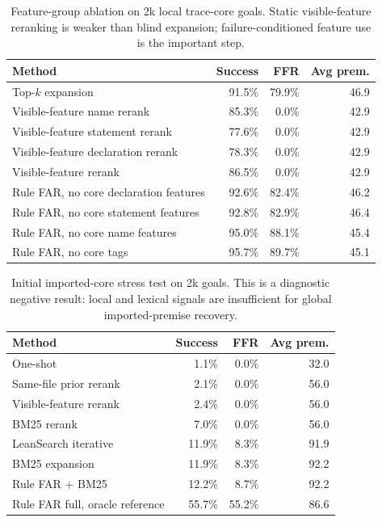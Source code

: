 \documentclass{article}
\begin{document}
\begin{table}[H]
\caption{Feature-group ablation on 2k local trace-core goals. Static visible-feature reranking is weaker than blind expansion; failure-conditioned feature use is the important step.}
\label{tab:appendix-feature}
\centering
\small
\begin{tabular}{lrrr}
\toprule
Method & Success & FFR & Avg prem. \\
\midrule
Top-$k$ expansion & 91.5\% & 79.9\% & 46.9 \\
Visible-feature name rerank & 85.3\% & 0.0\% & 42.9 \\
Visible-feature statement rerank & 77.6\% & 0.0\% & 42.9 \\
Visible-feature declaration rerank & 78.3\% & 0.0\% & 42.9 \\
Visible-feature rerank & 86.5\% & 0.0\% & 42.9 \\
Rule FAR, no core declaration features & 92.6\% & 82.4\% & 46.2 \\
Rule FAR, no core statement features & 92.8\% & 82.9\% & 46.4 \\
Rule FAR, no core name features & 95.0\% & 88.1\% & 45.4 \\
Rule FAR, no core tags & 95.7\% & 89.7\% & 45.1 \\
\bottomrule
\end{tabular}
\end{table}

\begin{table}[H]
\caption{Initial imported-core stress test on 2k goals. This is a diagnostic negative result: local and lexical signals are insufficient for global imported-premise recovery.}
\label{tab:appendix-global-stress}
\centering
\small
\begin{tabular}{lrrr}
\toprule
Method & Success & FFR & Avg prem. \\
\midrule
One-shot & 1.1\% & 0.0\% & 32.0 \\
Same-file prior rerank & 2.1\% & 0.0\% & 56.0 \\
Visible-feature rerank & 2.4\% & 0.0\% & 56.0 \\
BM25 rerank & 7.0\% & 0.0\% & 56.0 \\
LeanSearch iterative & 11.9\% & 8.3\% & 91.9 \\
BM25 expansion & 11.9\% & 8.3\% & 92.2 \\
Rule FAR + BM25 & 12.2\% & 8.7\% & 92.2 \\
Rule FAR full, oracle reference & 55.7\% & 55.2\% & 86.6 \\
\bottomrule
\end{tabular}
\end{table}
\end{document}
